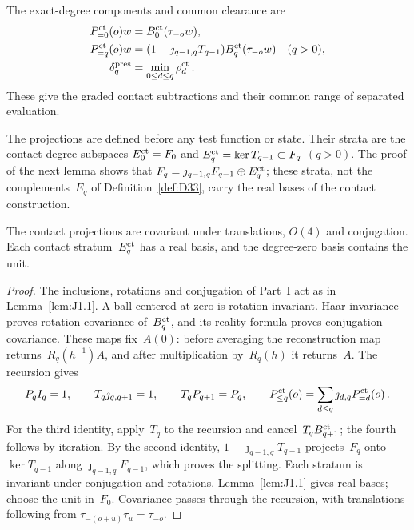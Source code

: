\begin{definition}\label{def:D38}
The exact-degree components and common clearance are
\begin{align*}
P_{=0}^{\rm ct}(o)w&=B_0^{\rm ct}(\tau_{-o}w),\\
P_{=q}^{\rm ct}(o)w&=(1-\jmath_{q-1,q}T_{q-1})B_q^{\rm ct}(\tau_{-o}w)\quad(q>0),\\
\delta_q^{\rm pres}&=\min_{0\le d\le q}\rho_d^{\rm ct}\,.
\end{align*}
These give the graded contact subtractions and their common range of separated evaluation.
\end{definition}

The projections are defined before any test function or state. Their strata are the contact degree subspaces $E_0^{\rm ct}=F_0$ and $E_q^{\rm ct}=\ker T_{q-1}\subset F_q$ $(q>0)$. The proof of the next lemma shows that $F_q=\jmath_{q-1,q}F_{q-1}\oplus E_q^{\rm ct}$; these strata, not the complements~$E_q$ of Definition~\ref{def:D33}, carry the real bases of the contact construction.

\begin{lemma}\label{lem:J2.1}
The contact projections are covariant under translations, $O(4)$ and conjugation. Each contact stratum~$E_q^{\rm ct}$ has a real basis, and the degree-zero basis contains the unit.
\end{lemma}

\begin{proof}
The inclusions, rotations and conjugation of Part~I act as in Lemma~\ref{lem:J1.1}. A ball centered at zero is rotation invariant. Haar invariance proves rotation covariance of~$B_q^{\rm ct}$, and its reality formula proves conjugation covariance. These maps fix~$A(0)$: before averaging the reconstruction map returns~$R_q(h^{-1})A$, and after multiplication by~$R_q(h)$ it returns~$A$. The recursion gives
\begin{equation}\label{eq:J-contact-split}
P_qI_q=1,\qquad T_q\jmath_{q,q+1}=1,\qquad T_qP_{q+1}=P_q,\qquad
P_{\le q}^{\rm ct}(o)=\sum_{d\le q}\jmath_{d,q}P_{=d}^{\rm ct}(o)\,.
\end{equation}
For the third identity, apply~$T_q$ to the recursion and cancel~$T_qB_{q+1}^{\rm ct}$; the fourth follows by iteration. By the second identity, $1-\jmath_{q-1,q}T_{q-1}$ projects~$F_q$ onto $\ker T_{q-1}$ along $\jmath_{q-1,q}F_{q-1}$, which proves the splitting. Each stratum is invariant under conjugation and rotations. Lemma~\ref{lem:J1.1} gives real bases; choose the unit in~$F_0$. Covariance passes through the recursion, with translations following from $\tau_{-(o+u)}\tau_u=\tau_{-o}$.
\end{proof}

